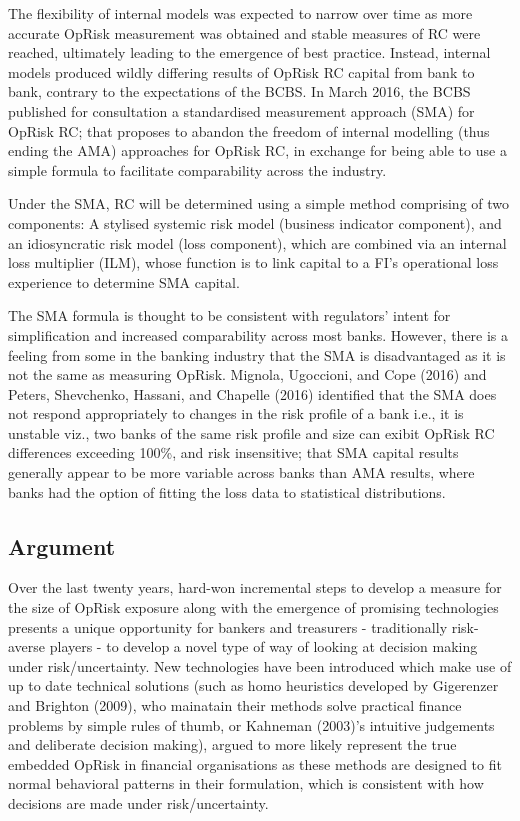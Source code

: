 \documentclass[]{DissertateUSU}
\begin{document}
The flexibility of internal models was expected to narrow over time as
more accurate OpRisk measurement was obtained and stable measures of RC
were reached, ultimately leading to the emergence of best practice.
Instead, internal models produced wildly differing results of OpRisk RC
capital from bank to bank, contrary to the expectations of the BCBS. In
March 2016, the BCBS published for consultation a standardised
measurement approach (SMA) for OpRisk RC; that proposes to abandon the
freedom of internal modelling (thus ending the AMA) approaches for
OpRisk RC, in exchange for being able to use a simple formula to
facilitate comparability across the industry.\medskip

Under the SMA, RC will be determined using a simple method comprising of
two components: A stylised systemic risk model (business indicator
component), and an idiosyncratic risk model (loss component), which are
combined via an internal loss multiplier (ILM), whose function is to
link capital to a FI's operational loss experience to determine SMA
capital.\medskip

The SMA formula is thought to be consistent with regulators' intent for
simplification and increased comparability across most banks. However,
there is a feeling from some in the banking industry that the SMA is
disadvantaged as it is not the same as measuring OpRisk. Mignola,
Ugoccioni, and Cope (2016) and Peters, Shevchenko, Hassani, and Chapelle
(2016) identified that the SMA does not respond appropriately to changes
in the risk profile of a bank i.e., it is unstable viz., two banks of
the same risk profile and size can exibit OpRisk RC differences
exceeding 100\%, and risk insensitive; that SMA capital results
generally appear to be more variable across banks than AMA results,
where banks had the option of fitting the loss data to statistical
distributions.\medskip 

\subsection{Argument}

Over the last twenty years, hard-won incremental steps to develop a
measure for the size of OpRisk exposure along with the emergence of
promising technologies presents a unique opportunity for bankers and
treasurers - traditionally risk-averse players - to develop a novel type
of way of looking at decision making under risk/uncertainty. New
technologies have been introduced which make use of up to date technical
solutions (such as homo heuristics developed by Gigerenzer and Brighton
(2009), who mainatain their methods solve practical finance problems by
simple rules of thumb, or Kahneman (2003)'s intuitive judgements and
deliberate decision making), argued to more likely represent the true
embedded OpRisk in financial organisations as these methods are designed
to fit normal behavioral patterns in their formulation, which is
consistent with how decisions are made under risk/uncertainty.\medskip 
\end{document}
